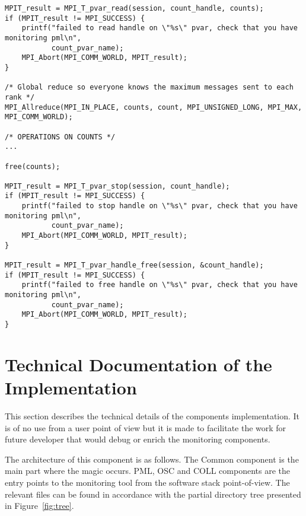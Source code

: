 \documentclass[notitlepage]{article}
\begin{document}
\begin{verbatim}
MPIT_result = MPI_T_pvar_read(session, count_handle, counts);
if (MPIT_result != MPI_SUCCESS) {
    printf("failed to read handle on \"%s\" pvar, check that you have monitoring pml\n",
           count_pvar_name);
    MPI_Abort(MPI_COMM_WORLD, MPIT_result);
}

/* Global reduce so everyone knows the maximum messages sent to each rank */
MPI_Allreduce(MPI_IN_PLACE, counts, count, MPI_UNSIGNED_LONG, MPI_MAX, MPI_COMM_WORLD);

/* OPERATIONS ON COUNTS */
...

free(counts);

MPIT_result = MPI_T_pvar_stop(session, count_handle);
if (MPIT_result != MPI_SUCCESS) {
    printf("failed to stop handle on \"%s\" pvar, check that you have monitoring pml\n",
           count_pvar_name);
    MPI_Abort(MPI_COMM_WORLD, MPIT_result);
}

MPIT_result = MPI_T_pvar_handle_free(session, &count_handle);
if (MPIT_result != MPI_SUCCESS) {
    printf("failed to free handle on \"%s\" pvar, check that you have monitoring pml\n",
           count_pvar_name);
    MPI_Abort(MPI_COMM_WORLD, MPIT_result);
}
\end{verbatim}

\section{Technical Documentation of the Implementation}
\label{sec:TDI}

This section describes the technical details of the components
implementation. It is of no use from a user point of view but it is made
to facilitate the work for future developer that would debug or enrich
the monitoring components.

The architecture of this component is as follows. The Common component
is the main part where the magic occurs. PML, OSC and COLL components
are the entry points to the monitoring tool from the software stack
point-of-view. The relevant files can be found in accordance with
the partial directory tree presented in Figure~\ref{fig:tree}.
\end{document}
